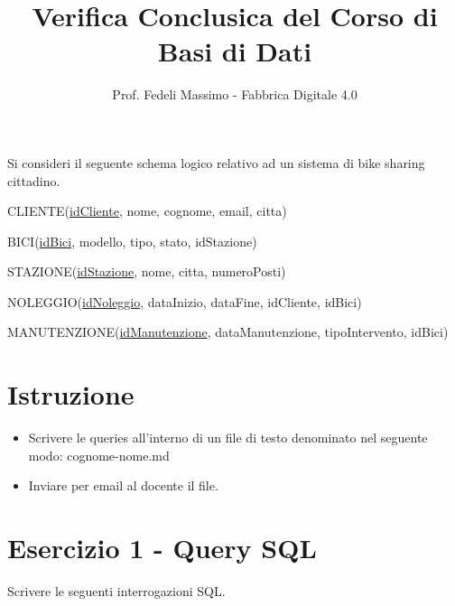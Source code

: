 \documentclass[a4paper,12pt]{article}
\title{Verifica Conclusica del Corso di Basi di Dati}
\author{Prof. Fedeli Massimo  - Fabbrica Digitale 4.0}
\date{}
\begin{document}
\maketitle

Si consideri il seguente schema logico relativo ad un sistema di bike sharing cittadino.

CLIENTE(\underline{idCliente}, nome, cognome, email, citta)

BICI(\underline{idBici}, modello, tipo, stato, idStazione)

STAZIONE(\underline{idStazione}, nome, citta, numeroPosti)

NOLEGGIO(\underline{idNoleggio}, dataInizio, dataFine, idCliente, idBici)

MANUTENZIONE(\underline{idManutenzione}, dataManutenzione, tipoIntervento, idBici)

\section{Istruzione}
\begin{itemize}
	\item Scrivere le queries all'interno di un file di testo denominato nel seguente modo:  cognome-nome.md
	\item Inviare per email al docente il file.
\end{itemize}

\section*{Esercizio 1 - Query SQL}

Scrivere le seguenti interrogazioni SQL.
\end{document}
